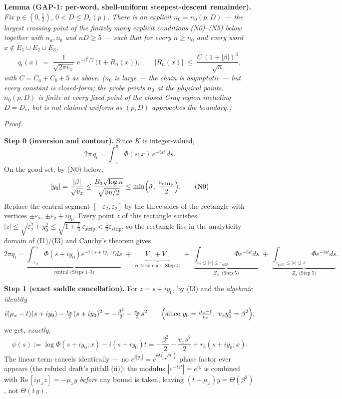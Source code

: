 \documentclass[
]{article}
\begin{document}
\bigskip
\noindent\textbf{Lemma (GAP-1: per-word, shell-uniform steepest-descent
remainder).}
\emph{Fix $p\in(0,\tfrac12)$, $0<D\le D_c(p)$.  There is an explicit
$n_0=n_0(p,D)$ --- the largest crossing point of the finitely many
explicit conditions (N0)--(N5) below together with $n_a,n_b$ and
$nD\ge5$ --- such that for every $n\ge n_0$ and every word
$x\notin\widetilde E_1\cup E_2\cup E_3$,}
\[
  q_t(x)\;=\;\frac{1}{\sqrt{2\pi v_x}}\;e^{-\beta^2/2}\,
  \bigl(1+R_n(x)\bigr),
  \qquad
  |R_n(x)|\;\le\;\frac{C\,(1+|\beta|)^3}{\sqrt n},
\]
\emph{with $C=C_a+C_b+5$ as above.  ($n_0$ is large --- the chain is
asymptotic --- but every constant is closed-form; the probe prints
$n_0$ at the physical points.  $n_0(p,D)$ is finite at every fixed
point of the closed Gray region including $D=D_c$, but is not claimed
uniform as $(p,D)$ approaches the boundary.)}

\bigskip
\noindent\emph{Proof.}

\textbf{Step 0 (inversion and contour).}  Since $K$ is integer-valued,
\[
  \tag{E0}
  2\pi\,q_t=\int_{-\pi}^{\pi}\Phi(s;x)\,e^{-ist}\,ds .
\]
On the good set, by (N0) below,
\[
  |y_0|=\frac{|\beta|}{\sqrt{v_x}}
  \le\frac{B_3\sqrt{\log n}}{\sqrt{\bar v n/2}}
  \le\min\Bigl(\tilde\sigma,\;
  \frac{\varepsilon_{\mathrm{strip}}}{2}\Bigr).
  \tag{N0}
\]
Replace the central segment $[-\varepsilon_2,\varepsilon_2]$ by the
three sides of the rectangle with vertices $\pm\varepsilon_2$,
$\pm\varepsilon_2+iy_0$.  Every point $z$ of this rectangle satisfies
$|z|\le\sqrt{\varepsilon_2^2+y_0^2}\le
\sqrt{1+\tfrac14}\,\varepsilon_{\mathrm{strip}}<
\tfrac43\varepsilon_{\mathrm{strip}}$, so the rectangle lies in the
analyticity domain of (I1)/(I3) and Cauchy's theorem gives
\[
  \tag{E1}
  2\pi q_t=\underbrace{\int_{-\varepsilon_2}^{\varepsilon_2}
  \Phi(s+iy_0)e^{-i(s+iy_0)t}ds}_{\text{central (Steps 1--3)}}
  \;+\;\underbrace{V_++V_-}_{\text{vertical ends (Step 4)}}
  \;+\;\underbrace{\int_{\varepsilon_2\le|s|\le
  \varepsilon_{\mathrm{split}}}\Phi e^{-ist}ds}_{Z_{2'}\text{ (Step 5)}}
  \;+\;\underbrace{\int_{\varepsilon_{\mathrm{split}}\le|s|\le\pi}
  \Phi e^{-ist}ds}_{Z_3\text{ (Step 5)}} .
\]

\textbf{Step 1 (exact saddle cancellation).}  For $z=s+iy_0$, by (I3)
and the \emph{algebraic identity}
\[
  i(\mu_x-t)(s+iy_0)-\tfrac{v_x}{2}(s+iy_0)^2
  =-\tfrac{\beta^2}{2}-\tfrac{v_x}{2}s^2
  \qquad\Bigl(\text{since } y_0=\tfrac{\mu_x-t}{v_x},\
  v_xy_0^2=\beta^2\Bigr),
\]
we get, \emph{exactly},
\[
  \tag{E2}
  \psi(s):=\log\Phi(s+iy_0;x)-i(s+iy_0)t
  =-\frac{\beta^2}{2}-\frac{v_x s^2}{2}+r_3(s+iy_0;x).
\]
The linear term cancels identically --- no $e^{t|y_0|}=e^{\Theta(\sqrt
n)}$ phase factor ever appears (the refuted draft's pitfall (ii)): the
modulus $|e^{-izt}|=e^{ty}$ is combined with
$\mathrm{Re}\,[i\mu_x z]=-\mu_x y$ \emph{before} any bound is taken,
leaving $(t-\mu_x)y=\Theta(\beta^2)$, not $\Theta(t\,y)$.
\end{document}

